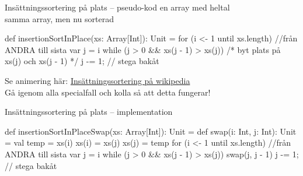 
\begin{Slide}{Insättningssortering på plats -- pseudo-kod}
 en array med heltal\\
 samma array, men nu sorterad\\
\begin{Code}
def insertionSortInPlace(xs: Array[Int]): Unit = {
  for (i <- 1 until xs.length) {  //från ANDRA till sista
    var j = i
    while (j > 0 && xs(j - 1) > xs(j)) {
      /* byt plats på xs(j) och xs(j - 1) */
      j -= 1;  // stega bakåt
    }
  }
}
\end{Code}
\pause
Se animering här: \href{https://sv.wikipedia.org/wiki/Ins\%C3\%A4ttningssortering}{Insättningssortering på wikipedia}\\
Gå igenom alla specialfall och kolla så att detta fungerar!
\end{Slide}

\begin{Slide}{Insättningssortering på plats -- implementation} %
\begin{Code}
def insertionSortInPlaceSwap(xs: Array[Int]): Unit = {
  def swap(i: Int, j: Int): Unit = {
    val temp = xs(i)
    xs(i) = xs(j)
    xs(j) = temp
  }
  for (i <- 1 until xs.length) {  //från ANDRA till sista
    var j = i
    while (j > 0 && xs(j - 1) > xs(j)) {
      swap(j, j - 1)
      j -= 1;  // stega bakåt
    }
  }
}
\end{Code}
\end{Slide}


